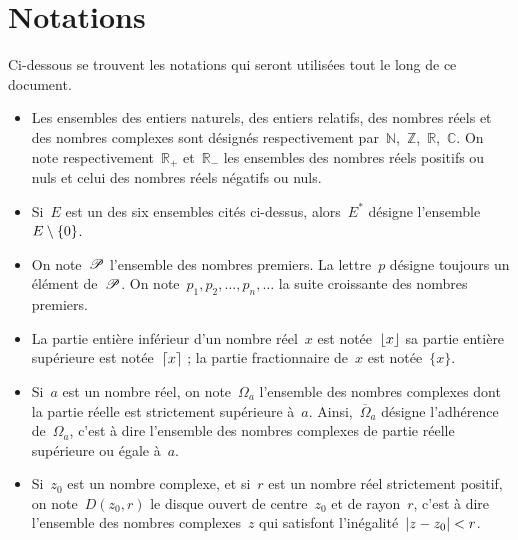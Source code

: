 		\section*{Notations}
		Ci-dessous se trouvent les notations qui seront utilisées tout le long de ce document.
		\begin{itemize}
			\item Les ensembles des entiers naturels, des entiers relatifs, des nombres réels et des nombres complexes sont désignés respectivement par~$\mathbb{N} $,~$\mathbb{Z} $,~$\mathbb{R} $,~$\mathbb{C}$. On note respectivement~$\mathbb{R}_+$ et~$\mathbb{R}_-$ les ensembles des nombres réels positifs ou nuls et celui des nombres réels négatifs ou nuls.
			\item Si~$E$ est un des six ensembles cités ci-dessus, alors~$E^*$ désigne l'ensemble~$E\setminus\{0\}$.
			\item On note~$\mathscr{P}$ l'ensemble des nombres premiers. La lettre~$p$ désigne toujours un élément de~$\mathscr{P}$. On note~$p_1,p_2,\ldots,p_n,\ldots$ la suite croissante des nombres premiers.
			\item La partie entière inférieur d'un nombre réel~$x$ est notée~$\lfloor x\rfloor$ sa partie entière supérieure est notée~$\lceil x\rceil$ ; la partie fractionnaire de~$x$ est notée~$\{x\}$.
			\item Si~$a$ est un nombre réel, on note~$\Omega_a$ l'ensemble des nombres complexes dont la partie réelle est strictement supérieure à~$a$. Ainsi,~$\overline
			{\Omega}_a$ désigne l'adhérence de~$\Omega_a$, c'est à dire l'ensemble des nombres complexes de partie réelle supérieure ou égale à~$a$.
			\item Si~$z_0$ est un nombre complexe, et si~$r$ est un nombre réel strictement positif, on note~$D(z_0,r)$ le disque ouvert de centre~$z_0$ et de rayon~$r$, c'est à dire l'ensemble des nombres complexes~$z$ qui satisfont l'inégalité~$\left\vert z-z_0\right\vert<r$.

\end{itemize}
